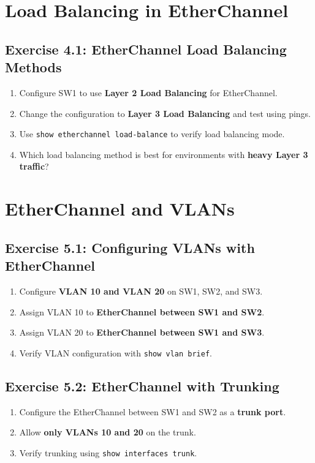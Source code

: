 \documentclass[a4paper]{article}
\begin{document}
\section{Load Balancing in EtherChannel}
\subsection{Exercise 4.1: EtherChannel Load Balancing Methods}
\begin{enumerate}
    \item Configure SW1 to use \textbf{Layer 2 Load Balancing} for EtherChannel.
    \item Change the configuration to \textbf{Layer 3 Load Balancing} and test using pings.
    \item Use \texttt{show etherchannel load-balance} to verify load balancing mode.
    \item Which load balancing method is best for environments with \textbf{heavy Layer 3 traffic}?
\end{enumerate}

\section{EtherChannel and VLANs}
\subsection{Exercise 5.1: Configuring VLANs with EtherChannel}
\begin{enumerate}
    \item Configure \textbf{VLAN 10 and VLAN 20} on SW1, SW2, and SW3.
    \item Assign VLAN 10 to \textbf{EtherChannel between SW1 and SW2}.
    \item Assign VLAN 20 to \textbf{EtherChannel between SW1 and SW3}.
    \item Verify VLAN configuration with \texttt{show vlan brief}.
\end{enumerate}

\subsection{Exercise 5.2: EtherChannel with Trunking}
\begin{enumerate}
    \item Configure the EtherChannel between SW1 and SW2 as a \textbf{trunk port}.
    \item Allow \textbf{only VLANs 10 and 20} on the trunk.
    \item Verify trunking using \texttt{show interfaces trunk}.
\end{enumerate}
\end{document}
